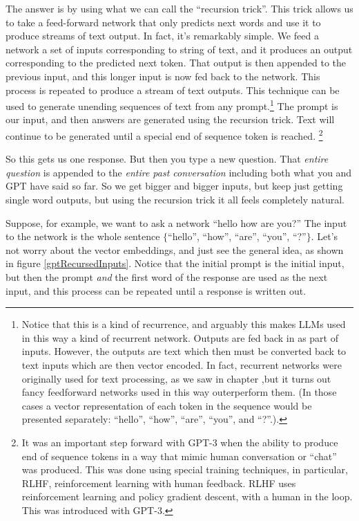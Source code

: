 The answer is by using what we can call the ``recursion trick''.  This trick allows us to take a feed-forward network that only predicts next words and use it to produce streams of text output. In fact, it's remarkably simple. We feed a network a set of inputs corresponding to string of text, and it produces an output corresponding to the predicted next token. That output is then appended to the previous input, and this longer input is now fed back to the network. This process is repeated to produce a stream of text outputs.  This technique can be used to generate unending sequences of text from any prompt.\footnote{Notice that this is a kind of recurrence, and arguably this makes LLMs used in this way a kind of recurrent network. Outputs are fed back in as part of inputs. However, the outputs are text which then must be converted back to text inputs which are then vector encoded.  In fact, recurrent networks were originally used for text processing, as we saw in chapter ,but it turns out fancy feedforward networks used in this way outerperform them.  (In those cases a vector representation of each token in the sequence would be presented separately: ``hello'', ``how'', ``are'', ``you'', and ``?''.).} The prompt is our input, and then answers are generated using the recursion trick. Text will continue to be generated until a special end of sequence token is reached. \footnote{It was an important step forward with GPT-3 when the ability to produce end of sequence tokens in a way that mimic human conversation or ``chat'' was produced. This was done using special training techniques, in particular, RLHF, reinforcement learning with human feedback. RLHF uses reinforcement learning and policy gradient descent, with a human in the loop. This was introduced with GPT-3.} 

So this gets us one response. But then you type a new question. That \emph{entire question} is appended to the \emph{entire past conversation} including both what you and GPT have said so far. So we get bigger and bigger inputs, but keep just getting single word outputs, but using the recursion trick it all feels completely natural.

Suppose, for example, we want to ask a network ``hello how are you?'' The input to the network is the whole sentence $\{$``hello'', ``how'', ``are'', ``you'', ``?''$\}$. Let's  not worry about the vector embeddings, and just see the general idea, as shown in figure \ref{gptRecursedInputs}. Notice that the initial prompt is the initial input, but then the prompt \emph{and} the first word of the response are used as the next input, and this process can be repeated until a response is written out.
  
